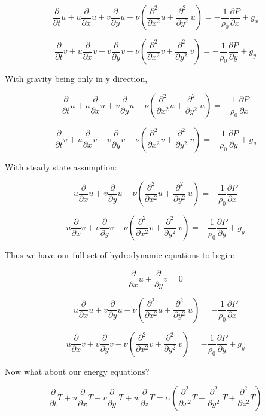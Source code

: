 \documentclass[11pt]{article}
\begin{document}
$$\frac{\partial }{\partial t} u + u \frac{\partial}{\partial x} u + v \frac{\partial}{\partial y} u  - \nu ( \frac{\partial^2}{\partial x^2} u + \frac{\partial^2}{\partial y^2} \ u ) = - \frac{1}{\rho_0} \frac{\partial P}{\partial x} +g_x$$

$$\frac{\partial }{\partial t} v + u \frac{\partial}{\partial x} v + v \frac{\partial}{\partial y} v  - \nu ( \frac{\partial^2}{\partial x^2} v + \frac{\partial^2}{\partial y^2} \ v ) = - \frac{1}{\rho_0} \frac{\partial P}{\partial y} +g_y$$

With gravity being only in y direction,

$$\frac{\partial }{\partial t} u + u \frac{\partial}{\partial x} u + v \frac{\partial}{\partial y} u  - \nu ( \frac{\partial^2}{\partial x^2} u + \frac{\partial^2}{\partial y^2} \ u ) = - \frac{1}{\rho_0} \frac{\partial P}{\partial x} $$

$$\frac{\partial }{\partial t} v + u \frac{\partial}{\partial x} v + v \frac{\partial}{\partial y} v  - \nu ( \frac{\partial^2}{\partial x^2} v + \frac{\partial^2}{\partial y^2} \ v ) = - \frac{1}{\rho_0} \frac{\partial P}{\partial y} +g_y$$

With steady state assumption:

$$ u \frac{\partial}{\partial x} u + v \frac{\partial}{\partial y} u  - \nu ( \frac{\partial^2}{\partial x^2} u + \frac{\partial^2}{\partial y^2} \ u ) = - \frac{1}{\rho_0} \frac{\partial P}{\partial x} $$

$$ u \frac{\partial}{\partial x} v + v \frac{\partial}{\partial y} v  - \nu ( \frac{\partial^2}{\partial x^2} v + \frac{\partial^2}{\partial y^2} \ v ) = - \frac{1}{\rho_0} \frac{\partial P}{\partial y} +g_y$$


Thus we have our full set of hydrodynamic equations to begin:


$$  \frac{\partial}{\partial x} u +  \frac{\partial}{\partial y} v  = 0$$

$$ u \frac{\partial}{\partial x} u + v \frac{\partial}{\partial y} u  - \nu ( \frac{\partial^2}{\partial x^2} u + \frac{\partial^2}{\partial y^2} \ u ) = - \frac{1}{\rho_0} \frac{\partial P}{\partial x} $$

$$ u \frac{\partial}{\partial x} v + v \frac{\partial}{\partial y} v  - \nu ( \frac{\partial^2}{\partial x^2} v + \frac{\partial^2}{\partial y^2} \ v ) = - \frac{1}{\rho_0} \frac{\partial P}{\partial y} +g_y$$

Now what about our energy equations?

$$\frac{\partial }{\partial t} T + u \frac{\partial}{\partial x} T + v \frac{\partial }{\partial y} \ T + w \frac{\partial }{\partial z} T  = \alpha ( \frac{\partial^2}{\partial x^2} T +  \frac{\partial^2 }{\partial y^2} \ T +  \frac{\partial^2 }{\partial z^2} T) $$ 
\end{document}
